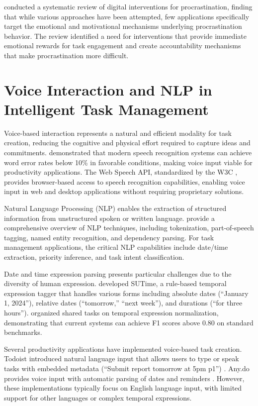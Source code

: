 \citet{klingseis2021overcoming} conducted a systematic review of digital interventions for procrastination, finding that while various approaches have been attempted, few applications specifically target the emotional and motivational mechanisms underlying procrastination behavior. The review identified a need for interventions that provide immediate emotional rewards for task engagement and create accountability mechanisms that make procrastination more difficult.

\section{Voice Interaction and NLP in Intelligent Task Management}
\label{sec:voice-nlp}

\inprogress

Voice-based interaction represents a natural and efficient modality for task creation, reducing the cognitive and physical effort required to capture ideas and commitments. \citet{schalkwyk2010your} demonstrated that modern speech recognition systems can achieve word error rates below 10\% in favorable conditions, making voice input viable for productivity applications. The Web Speech API, standardized by the W3C \citep{shires2012web}, provides browser-based access to speech recognition capabilities, enabling voice input in web and desktop applications without requiring proprietary solutions.

Natural Language Processing (NLP) enables the extraction of structured information from unstructured spoken or written language. \citet{jurafsky2020speech} provide a comprehensive overview of NLP techniques, including tokenization, part-of-speech tagging, named entity recognition, and dependency parsing. For task management applications, the critical NLP capabilities include date/time extraction, priority inference, and task intent classification.

Date and time expression parsing presents particular challenges due to the diversity of human expression. \citet{chang2012sutime} developed SUTime, a rule-based temporal expression tagger that handles various forms including absolute dates (``January 1, 2024''), relative dates (``tomorrow,'' ``next week''), and durations (``for three hours''). \citet{bethard2013semeval} organized shared tasks on temporal expression normalization, demonstrating that current systems can achieve F1 scores above 0.80 on standard benchmarks.

Several productivity applications have implemented voice-based task creation. Todoist introduced natural language input that allows users to type or speak tasks with embedded metadata (``Submit report tomorrow at 5pm p1'') \citationneeded. Any.do provides voice input with automatic parsing of dates and reminders \citationneeded. However, these implementations typically focus on English language input, with limited support for other languages or complex temporal expressions.


